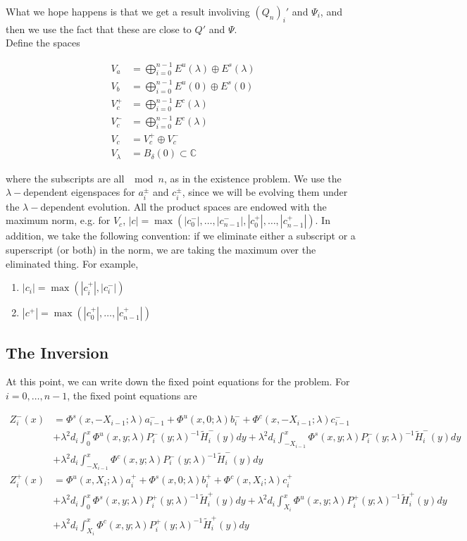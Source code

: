 \documentclass[12pt]{article}
\def\C{{\mathbb C}}
\begin{document}
What we hope happens is that we get a result involiving $(Q_n)_i'$ and $\Psi_i$, and then we use the fact that these are close to $Q'$ and $\Psi$.\\

Define the spaces

\begin{align*}
V_a &= \bigoplus_{i=0}^{n-1} E^u(\lambda) \oplus E^s(\lambda) \\
V_b &= \bigoplus_{i=0}^{n-1} E^u(0) \oplus E^s(0) \\
V_c^+ &= \bigoplus_{i=0}^{n-1} E^c(\lambda) \\
V_c^- &= \bigoplus_{i=0}^{n-1} E^c(\lambda) \\
V_c &= V_c^+ \oplus V_c^- \\
V_\lambda &= B_\delta(0) \subset \C
\end{align*}

where the subscripts are all $\mod n$, as in the existence problem. We use the $\lambda-$dependent eigenspaces for $a_i^\pm$ and $c_i^\pm$, since we will be evolving them under the $\lambda-$dependent evolution. All the product spaces are endowed with the maximum norm, e.g. for $V_c$, $|c| = \max(|c_0^-|, \dots, |c_{n-1}^-|, |c_0^+|, \dots, |c_{n-1}^+|)$. In addition, we take the following convention: if we eliminate either a subscript or a superscript (or both) in the norm, we are taking the maximum over the eliminated thing. For example,
\begin{enumerate}
	\item $|c_i| = \max(|c_i^+|, |c_i^-|)$ 
	\item $|c^+| = \max(|c_0^+|, \dots, |c_{n-1}^+|)$
\end{enumerate}

\subsection*{The Inversion}

At this point, we can write down the fixed point equations for the problem. For $i = 0, \dots, n-1$, the fixed point equations are

\begin{align*}
Z_i^-(x) &= \Phi^s(x, -X_{i-1}; \lambda) a_{i-1}^- + \Phi^u(x, 0; \lambda) b_i^- + \Phi^c(x, -X_{i-1}; \lambda) c_{i-1}^- \\
&+ \lambda^2 d_i \int_0^x \Phi^u(x, y; \lambda) P_i^-(y; \lambda)^{-1} \tilde{H}_i^-(y) dy
+ \lambda^2 d_i \int_{-X_{i-1}}^x \Phi^s(x, y; \lambda) P_i^-(y; \lambda)^{-1} \tilde{H}_i^-(y) dy \\
&+ \lambda^2 d_i \int_{-X_{i-1}}^x \Phi^c(x, y; \lambda) P_i^-(y; \lambda)^{-1} \tilde{H}_i^-(y) dy  \\ 
Z_i^+(x) &= \Phi^u(x, X_i; \lambda) a_i^+ + \Phi^s(x, 0; \lambda) b_i^+ + \Phi^c(x, X_i; \lambda) c_i^+ \\
&+ \lambda^2 d_i \int_0^x \Phi^s(x, y; \lambda) P_i^+(y; \lambda)^{-1} \tilde{H}_i^+(y) dy
+ \lambda^2 d_i \int_{X_i}^x \Phi^u(x, y; \lambda) P_i^+(y; \lambda)^{-1} \tilde{H}_i^+(y) dy \\
&+ \lambda^2 d_i \int_{X_i}^x \Phi^c(x, y; \lambda) P_i^+(y; \lambda)^{-1} \tilde{H}_i^+(y) dy \\
\end{align*}
\end{document}
